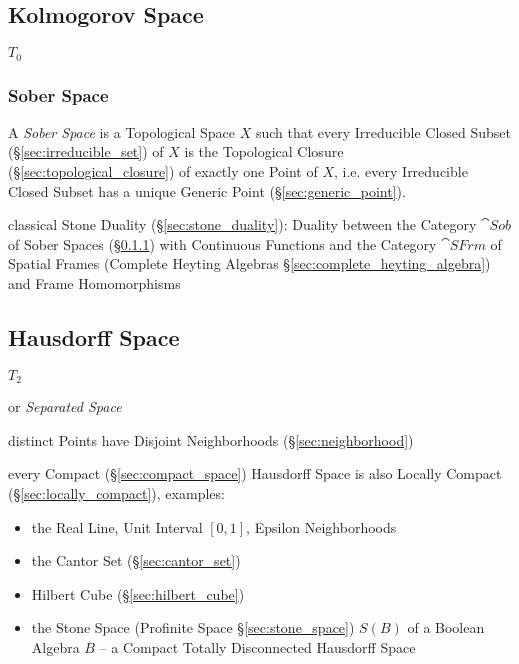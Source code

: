 \subsection{Kolmogorov Space}\label{sec:kolmogorov_space}

$\xspace{T}_0$



\subsubsection{Sober Space}\label{sec:sober_space}

A \emph{Sober Space} is a Topological Space $X$ such that every Irreducible
Closed Subset (\S\ref{sec:irreducible_set}) of $X$ is the Topological Closure
(\S\ref{sec:topological_closure}) of exactly one Point of $X$, i.e. every
Irreducible Closed Subset has a unique Generic Point
(\S\ref{sec:generic_point}).

classical Stone Duality (\S\ref{sec:stone_duality}): Duality between the
Category $\cat{Sob}$ of Sober Spaces (\S\ref{sec:sober_space}) with Continuous
Functions and the Category $\cat{SFrm}$ of Spatial Frames (Complete Heyting
Algebras \S\ref{sec:complete_heyting_algebra}) and Frame Homomorphisms



\subsection{Hausdorff Space}\label{sec:hausdorff_space}

$\xspace{T}_2$

or \emph{Separated Space}

distinct Points have Disjoint Neighborhoods (\S\ref{sec:neighborhood})

every Compact (\S\ref{sec:compact_space}) Hausdorff Space is also Locally
Compact (\S\ref{sec:locally_compact}), examples:
\begin{itemize}
  \item the Real Line, Unit Interval $[0,1]$, Epsilon Neighborhoods
  \item the Cantor Set (\S\ref{sec:cantor_set})
  \item Hilbert Cube (\S\ref{sec:hilbert_cube})
  \item the Stone Space (Profinite Space \S\ref{sec:stone_space})
    $\xspace{S}(B)$ of a Boolean Algebra $B$ -- a Compact Totally Disconnected
    Hausdorff Space
\end{itemize}

